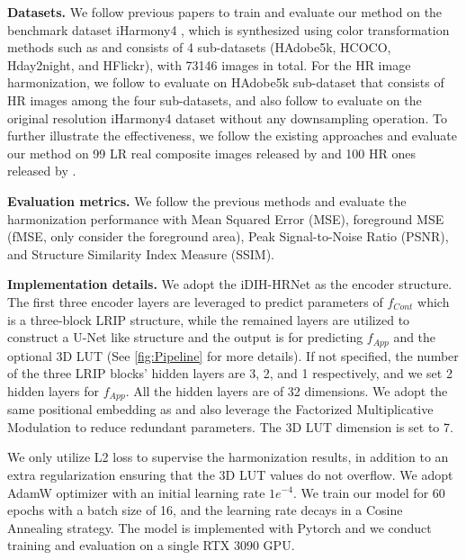 \documentclass[10pt,journal,twocolumn,twoside]{IEEEtran}
\begin{document}
\textbf{Datasets.} We follow previous papers to train and evaluate our method on the benchmark dataset iHarmony4 \cite{cong2020dovenet}, which is synthesized using color transformation methods such as \cite{fecker2008histogram} and consists of 4 sub-datasets (HAdobe5k, HCOCO, Hday2night, and HFlickr), with 73146 images in total. For the HR image harmonization, we follow \cite{cong2022high} to evaluate on HAdobe5k sub-dataset that consists of HR images among the four sub-datasets, and also follow \cite{ke2022harmonizer, xue2022dccf} to evaluate on the original resolution iHarmony4 dataset without any downsampling operation. To further illustrate the effectiveness, we follow the existing approaches \cite{hang2022scs, ling2021region, guo2021image, cong2022high} and evaluate our method on 99 LR real composite images released by \cite{tsai2017deep} and 100 HR ones released by \cite{cong2022high}.

\textbf{Evaluation metrics.} We follow the previous methods and evaluate the harmonization performance with Mean Squared Error (MSE), foreground MSE (fMSE, only consider the foreground area), Peak Signal-to-Noise Ratio (PSNR), and Structure Similarity Index Measure (SSIM).

\textbf{Implementation details.}
We adopt the iDIH-HRNet \cite{sofiiuk2021foreground} as the encoder structure. The first three encoder layers are leveraged to predict parameters of $f_{Cont}$ which is a three-block LRIP structure, while the remained layers are utilized to construct a U-Net\cite{ronneberger2015u} like structure and the output is for predicting $f_{App}$ and the optional 3D LUT (See \cref{fig:Pipeline} for more details). If not specified, the number of the three LRIP blocks' hidden layers are 3, 2, and 1 respectively, and we set 2 hidden layers for $f_{App}$. All the hidden layers are of 32 dimensions. We adopt the same positional embedding as \cite{anokhin2021image} and also leverage the Factorized Multiplicative Modulation\cite{skorokhodov2021adversarial} to reduce redundant parameters. The 3D LUT dimension is set to 7.

We only utilize L2 loss to supervise the harmonization results, in addition to an extra regularization ensuring that the 3D LUT values do not overflow. We adopt AdamW\cite{loshchilov2018decoupled} optimizer with an initial learning rate $1e^{-4}$. We train our model for 60 epochs with a batch size of 16, and the learning rate decays in a Cosine Annealing strategy. The model is implemented with Pytorch and we conduct training and evaluation on a single RTX 3090 GPU.
\end{document}
